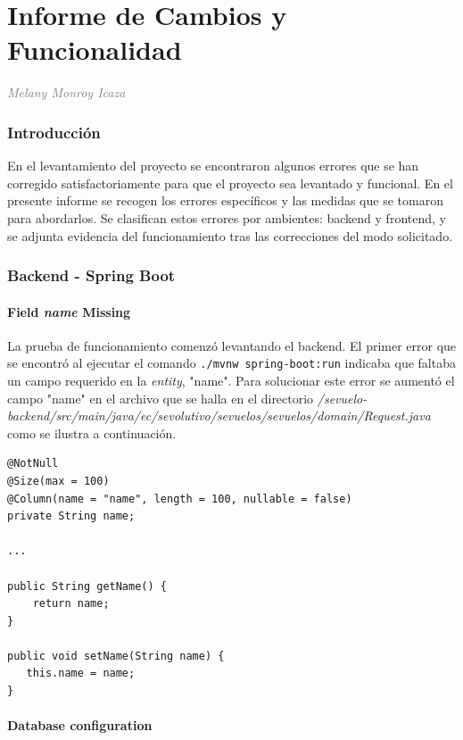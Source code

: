 \documentclass{article}
\begin{document}
	
	\lstset{basicstyle=\footnotesize\ttfamily,breaklines=true}
	\part*{Informe de Cambios y Funcionalidad}
	\textcolor{gray}{\emph{Melany Monroy Icaza}}
	
	\section*{Introducción}
	
	En el levantamiento del proyecto se encontraron algunos errores que se 
	han corregido satisfactoriamente para que el proyecto sea levantado y 
	funcional. En el presente informe se recogen los errores específicos y 
	las medidas que se tomaron para abordarlos. Se clasifican estos errores 
	por ambientes: backend y frontend, y se adjunta evidencia del 
	funcionamiento tras las correcciones del modo solicitado.
	
	\section*{Backend - Spring Boot}
	
	\subsection*{Field \emph{name} Missing}
	
	La prueba de funcionamiento comenzó levantando el backend. El primer 
	error que se encontró al ejecutar el comando \texttt{./mvnw 
	spring-boot:run} indicaba que faltaba un campo requerido en la 
	\emph{entity}, "name". Para solucionar este error se aumentó el campo 
	"name" en el archivo que se halla en el directorio 
	\emph{/sevuelo-backend/src/main/java/ec/sevolutivo/sevuelos/sevuelos/domain/Request.java}
	 como se ilustra a continuación.
	
	\begin{lstlisting}
@NotNull
@Size(max = 100)
@Column(name = "name", length = 100, nullable = false)
private String name;

...

public String getName() {
	return name;
}

public void setName(String name) {
   this.name = name;
}
	\end{lstlisting}
	
	\subsection*{Database configuration}
	
\end{document}

